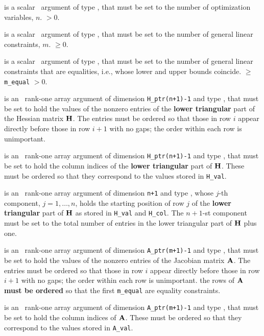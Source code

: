 \documentclass{galahad}
\begin{document}
\begin{description}
 is a scalar \intentin\ argument of type \integer,
 that must be set  to the number of optimization variables, $n$.
 $> 0$.

 is a scalar \intentin\ argument of type \integer,
 that must be set to the number of general linear constraints, $m$.
 $\geq 0$.

 is a scalar \intentin\ argument of type \integer,
 that must be set to the number of general linear constraints that
 are equalities, i.e., whose lower and upper bounds coincide.
 $\geq$ {\tt m\_equal} $> 0$.

 is an \intentin\  rank-one array argument
of dimension {\tt H\_ptr(n+1)-1} and type \realdp, that must be set
to hold the values of the nonzero entries of the {\bf lower triangular} part
of the Hessian matrix ${\mathbf{H}}$. The entries must be ordered so that those
in row $i$ appear directly before those in row $i+1$ with no gaps;
the order within each row is unimportant.

 is an \intentin\ rank-one array argument
of dimension {\tt H\_ptr(n+1)-1} and type \integer, that must be set
to hold the column indices of the {\bf lower triangular} part of
${\mathbf{H}}$. These must be ordered so that they correspond to the values stored
in {\tt H\_val}.

 is an \intentin\ rank-one array argument
of dimension {\tt n+1} and type \integer,
whose $j$-th component, $j = 1, \ldots , n$, holds the
starting position of row $j$ of the {\bf lower triangular} part of
${\mathbf{H}}$ as stored in {\tt H\_val} and {\tt H\_col}. The $n+1$-st
component must be set to the total number of entries in the lower
triangular part of ${\mathbf{H}}$ plus one.

 is an \intentin\  rank-one array argument
of dimension {\tt A\_ptr(m+1)-1} and type \realdp, that must be set
to hold the values of the nonzero entries
of the Jacobian matrix ${\mathbf{A}}$. The entries must be ordered so that those
in row $i$ appear directly before those in row $i+1$ with no gaps;
the order within each row is unimportant. 
\restriction the rows of ${\mathbf{A}}$ {\bf must be ordered} 
so that the first {\tt m\_equal} are equality constraints.

 is an \intentin\ rank-one array argument
of dimension {\tt A\_ptr(m+1)-1} and type \integer, that must be set
to hold the column indices of ${\mathbf{A}}$. These must be ordered so that they
correspond to the values stored in {\tt A\_val}.


\end{description}
\end{document}
